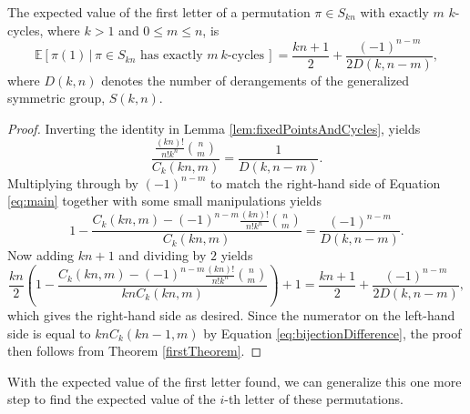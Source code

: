 \begin{theorem}
  \label{secondTheorem}
  The expected value of the first letter of a permutation
  $\pi \in S_{kn}$ with exactly $m$ $k$-cycles, where $k > 1$ and $0 \leq m \leq n$, is
  \begin{equation}
    \label{eq:main}
    \mathbb{E}[\pi(1)\, |\, \pi \in S_{kn} \text{ has exactly } m\ k \text{-cycles}\,] =
    \frac{kn + 1}{2} + \frac{(-1)^{n-m}}{2 D(k, n - m)},
  \end{equation}
  where $D(k, n)$ denotes the number of derangements of the generalized symmetric
  group, $S(k, n)$.
\end{theorem}
\begin{proof}
  Inverting the identity in Lemma \ref{lem:fixedPointsAndCycles}, yields \begin{equation}
    \frac{\frac{(kn)!}{n!k^n}\binom n m}{C_k(kn, m)}
    = \frac{1}{D(k, n - m)}.
  \end{equation}
  Multiplying through by $(-1)^{n - m}$ to match the right-hand side of Equation
  \eqref{eq:main} together with some small manipulations yields \begin{equation}
    1 - \frac{C_k(kn, m) - (-1)^{n - m}\frac{(kn)!}{n!k^n}\binom n m}{C_k(kn, m)}
    = \frac{(-1)^{n-m}}{D(k, n - m)}.
  \end{equation}
  Now adding $kn + 1$ and dividing by $2$ yields \begin{equation}
    \frac{kn}{2}\left(1 - \frac{C_k(kn, m) - (-1)^{n - m}\frac{(kn)!}{n!k^n}\binom n m}{knC_k(kn, m)}\right) + 1
    = \frac{kn+1}{2} + \frac{(-1)^{n-m}}{2 D(k, n - m)},
  \end{equation}
  which gives the right-hand side as desired.
  Since the numerator on the left-hand
  side is equal to ${kn C_k(kn - 1, m)}$ by Equation \eqref{eq:bijectionDifference},
  the proof then follows from Theorem \ref{firstTheorem}.
\end{proof}

With the expected value of the first letter found,
we can generalize this one more step to find the expected value of the
$i$-th letter of these permutations.

